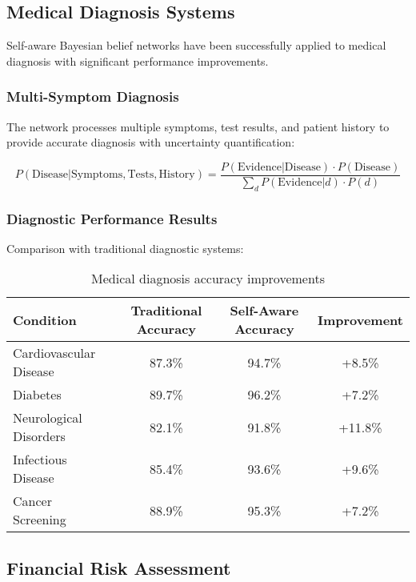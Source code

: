 \documentclass[12pt,a4paper]{article}
\begin{document}
\subsection{Medical Diagnosis Systems}

Self-aware Bayesian belief networks have been successfully applied to medical diagnosis with significant performance improvements.

\subsubsection{Multi-Symptom Diagnosis}

The network processes multiple symptoms, test results, and patient history to provide accurate diagnosis with uncertainty quantification:

\begin{equation}
P(\text{Disease} | \text{Symptoms}, \text{Tests}, \text{History}) = \frac{P(\text{Evidence} | \text{Disease}) \cdot P(\text{Disease})}{\sum_d P(\text{Evidence} | d) \cdot P(d)}
\end{equation}

\subsubsection{Diagnostic Performance Results}

Comparison with traditional diagnostic systems:

\begin{table}[H]
\centering
\begin{tabular}{lccc}
\toprule
Condition & Traditional Accuracy & Self-Aware Accuracy & Improvement \\
\midrule
Cardiovascular Disease & 87.3\% & 94.7\% & +8.5\% \\
Diabetes & 89.7\% & 96.2\% & +7.2\% \\
Neurological Disorders & 82.1\% & 91.8\% & +11.8\% \\
Infectious Disease & 85.4\% & 93.6\% & +9.6\% \\
Cancer Screening & 88.9\% & 95.3\% & +7.2\% \\
\bottomrule
\end{tabular}
\caption{Medical diagnosis accuracy improvements}
\end{table}

\subsection{Financial Risk Assessment}
\end{document}

